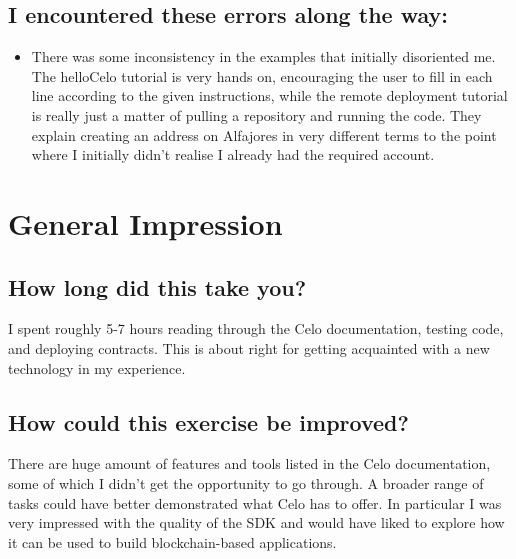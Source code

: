 \documentclass[a4paper,11pt]{article}
\begin{document}
\subsection*{I encountered these errors along the way:}
\begin{itemize}
\item There was some inconsistency in the examples that initially disoriented
  me.  The helloCelo tutorial is very hands on, encouraging the user to fill in
  each line according to the given instructions, while the remote deployment
  tutorial is really just a matter of pulling a repository and running the code.
  They explain creating an address on Alfajores in very different terms to the
  point where I initially didn't realise I already had the required account.
\end{itemize}
\section*{General Impression}
\subsection*{How long did this take you?}
I spent roughly 5-7 hours reading through the Celo documentation, testing code,
and deploying contracts.  This is about right for getting acquainted with a new
technology in my experience.
\subsection*{How could this exercise be improved?}
There are huge amount of features and tools listed in the Celo documentation,
some of which I didn't get the opportunity to go through.  A broader range
of tasks could have better demonstrated what Celo has to offer.  In particular I
was very impressed with the quality of the SDK and would have liked to explore
how it can be used to build blockchain-based applications.
\end{document}
